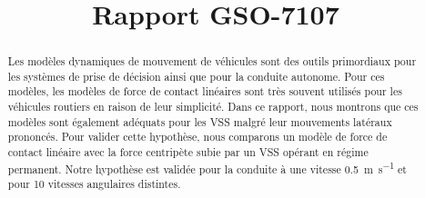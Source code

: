 \documentclass[conference]{IEEEtran}
\begin{document}

\title{Rapport GSO-7107\\}

\author{
}

\maketitle

\begin{abstract}
Les modèles dynamiques de mouvement de véhicules sont des outils primordiaux pour les systèmes de prise de décision ainsi que pour la conduite autonome.
Pour ces modèles, les modèles de force de contact linéaires sont très souvent utilisés pour les véhicules routiers en raison de leur simplicité.
Dans ce rapport, nous montrons que ces modèles sont également adéquats pour les \ac{VSS} malgré leur mouvements latéraux prononcés.
Pour valider cette hypothèse, nous comparons un modèle de force de contact linéaire avec la force centripète subie par un \ac{VSS} opérant en régime permanent.
Notre hypothèse est validée pour la conduite à une vitesse \SI{0.5}{\meter\per\second} et pour 10 vitesses angulaires distintes.
\end{abstract}










\printbibliography
\end{document}
